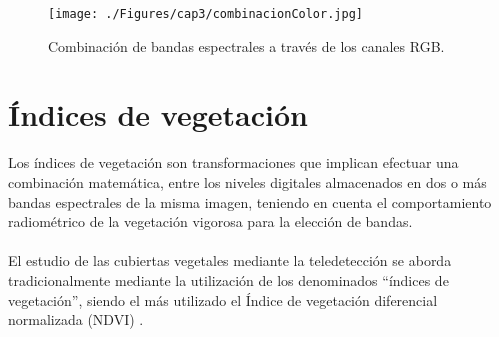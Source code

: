   \begin{figure}[H]
  	\centering
  	\texttt{[image: ./Figures/cap3/combinacionColor.jpg]}
  	\caption{Combinaci\'on de bandas espectrales a trav\'es de los canales RGB.}
  	\label{fig:combinacionColor}
  \end{figure}

 
\section{\'Indices de vegetaci\'on}
Los \'indices de vegetaci\'on son transformaciones que implican efectuar una combinaci\'on matem\'atica, entre los niveles digitales almacenados en dos o m\'as bandas espectrales de la misma imagen, teniendo en cuenta el comportamiento radiom\'etrico de la vegetaci\'on vigorosa para la elecci\'on de bandas\cite{speranza2005potencialidad}. \\~\\
El estudio de las cubiertas vegetales mediante la teledetecci\'on se aborda tradicionalmente mediante la utilización de los denominados “índices de vegetaci\'on”, siendo el m\'as utilizado el \'Indice de vegetaci\'on diferencial normalizada (NDVI) \cite{sader2000estimacion}.

